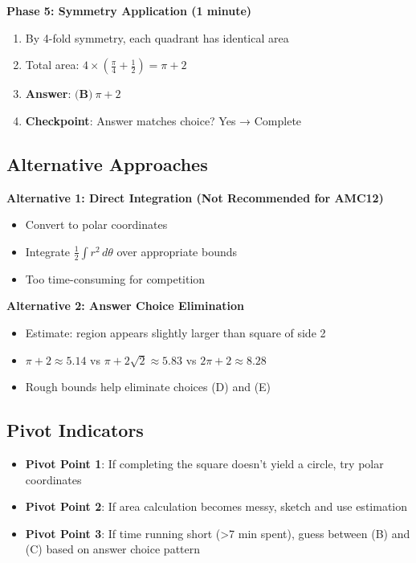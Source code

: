 \documentclass[]{article}
\begin{document}
\begin{solutionbox}
\textbf{Phase 5: Symmetry Application (1 minute)}
\begin{enumerate}[leftmargin=*]
    \item By 4-fold symmetry, each quadrant has identical area
    \item Total area: $4 \times (\frac{\pi}{4} + \frac{1}{2}) = \pi + 2$
    \item \textbf{Answer}: $\boxed{\textbf{(B)}\ \pi + 2}$
    \item \textbf{Checkpoint}: Answer matches choice? Yes → Complete
\end{enumerate}

\subsection*{Alternative Approaches}

\textbf{Alternative 1: Direct Integration (Not Recommended for AMC12)}
\begin{itemize}[leftmargin=*]
    \item Convert to polar coordinates
    \item Integrate $\frac{1}{2} \int r^2 \, d\theta$ over appropriate bounds
    \item Too time-consuming for competition
\end{itemize}

\textbf{Alternative 2: Answer Choice Elimination}
\begin{itemize}[leftmargin=*]
    \item Estimate: region appears slightly larger than square of side 2
    \item $\pi + 2 \approx 5.14$ vs $\pi + 2\sqrt{2} \approx 5.83$ vs $2\pi + 2 \approx 8.28$
    \item Rough bounds help eliminate choices (D) and (E)
\end{itemize}

\subsection*{Pivot Indicators}
\begin{itemize}[leftmargin=*]
    \item \textbf{Pivot Point 1}: If completing the square doesn't yield a circle, try polar coordinates
    \item \textbf{Pivot Point 2}: If area calculation becomes messy, sketch and use estimation
    \item \textbf{Pivot Point 3}: If time running short (>7 min spent), guess between (B) and (C) based on answer choice pattern
\end{itemize}


\end{solutionbox}
\end{document}
